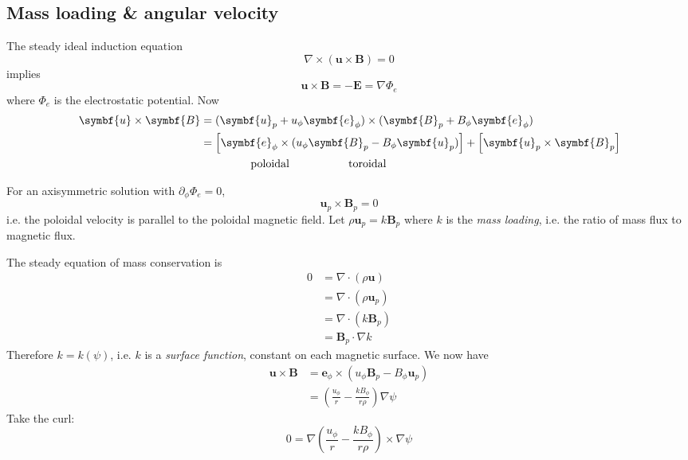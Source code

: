 \documentclass{jknotes}
\newcommand{\B}{\symbf{B}}
\renewcommand{\u}{\symbf{u}}
\begin{document}
\subsection{Mass loading \& angular velocity}
The steady ideal induction equation
\begin{equation}
	\nabla \times (\u \times \B) = 0
\end{equation}
implies
\begin{equation}
	\u \times \B = -\symbf{E} = \nabla \Phi_e
\end{equation}
where $\Phi_e$ is the electrostatic potential. Now
\begin{align}
	\u \times \B &= (\u_p + u_\phi \symbf{e}_\phi) \times (\B_p + B_\phi
	\symbf{e}_\phi) \\
				 &= \left[\symbf{e}_\phi \times (u_\phi \B_p - B_\phi
				 \u_p)\right] + \left[ \u_p \times \B_p\right] \\
				&\hspace{4.5em} \text{poloidal} \hspace{5.3em} \text{toroidal}
\end{align}

For an axisymmetric solution with $\partial_\phi \Phi_e = 0$,
\begin{equation}
	\u_p \times \B_p = 0
\end{equation}
i.e. the poloidal velocity is parallel to the poloidal magnetic field. Let
$\rho \u_p = k \B_p$ where $k$ is the \emph{mass loading}, i.e. the ratio of
mass flux to magnetic flux. 

The steady equation of mass conservation is
\begin{align}
	0 &= \nabla \cdot (\rho \u) \\
	  &= \nabla \cdot (\rho \u_p) \\
	  &= \nabla \cdot (k \B_p) \\
	  &= \B_p \cdot \nabla k
\end{align}
Therefore $k = k(\psi)$, i.e. $k$ is a \emph{surface function}, constant on
each magnetic surface. We now have
\begin{align}
	\u \times \B &= \symbf{e}_\phi \times (u_\phi \B_p - B_\phi \u_p) \\
				 &= \left( \frac{u_\phi}{r} - \frac{kB_\phi}{r\rho}\right)
				 \nabla \psi
\end{align}
Take the curl:
\begin{equation}
	0 = \nabla \left( \frac{u_\phi}{r} - \frac{kB_\phi}{r\rho}\right) \times
	\nabla \psi
\end{equation}
\end{document}
